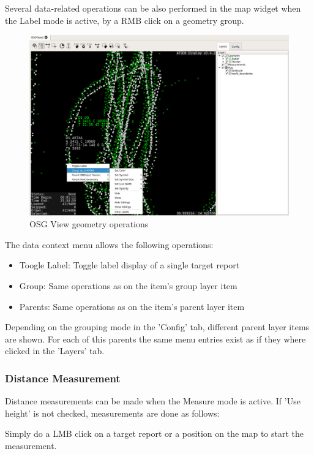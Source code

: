 {Several data-related operations can be also performed in the map widget when the Label mode is active, by a RMB click on a geometry group.


\begin{figure}[H]
    \hspace*{-2cm}
    \includegraphics[width=18cm,frame]{../screenshots/osgview_data_operations.png}
  \caption{OSG View geometry operations}
\end{figure}

The data context menu allows the following operations:

\begin{itemize}
 \item Toogle Label: Toggle label display of a single target report
 \item Group: Same operations as on the item's group layer item
 \item Parents: Same operations as on the item's parent layer item
\end{itemize}

Depending on the grouping mode in the 'Config' tab, different parent layer items are shown. For each of this parents the same menu entries exist as if they where clicked in the 'Layers' tab.

\subsubsection{Distance Measurement}

Distance measurements can be made when the Measure mode is active. If 'Use height' is not checked, measurements are done as follows:

Simply do a LMB click on a target report or a position on the map to start the measurement.

}
